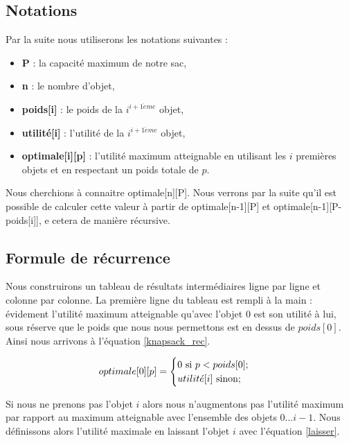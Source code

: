 \subsection{Notations}

Par la suite nous utiliserons les notations suivantes :

\begin{itemize}
\item \textbf{P} : la capacité maximum de notre sac,
\item \textbf{n} : le nombre d'objet,
\item \textbf{poids[i]} : le poids de la $i^{i+1\grave{e}me}$ objet,
\item \textbf{utilité[i]} : l'utilité de la $i^{i+1\grave{e}me}$ objet,
\item \textbf{optimale[i][p]} : l'utilité maximum atteignable en utilisant les $i$ premières objets et en respectant un poids totale de $p$.
\end{itemize} 

Nous cherchions à connaitre optimale[n][P]. Nous verrons par la suite qu'il est possible de calculer cette valeur à partir de optimale[n-1][P] et optimale[n-1][P-poids[i]], e cetera de manière récursive.

\subsection{Formule de récurrence}
Nous construirons un tableau de résultats intermédiaires ligne par ligne et colonne par colonne. La première ligne du tableau est rempli à la main : évidement l'utilité maximum atteignable qu'avec l'objet $0$ est son utilité à lui, sous réserve que le poids que nous nous permettons est en dessus de $poids[0]$. Ainsi nous arrivons à l'équation \ref{knapsack_rec}.

\begin{equation}
\label{knapsack_rec}
optimale[0][p] =
	\begin{cases}
		0 \text{ si } p < poids[0];	\\
		utilit\acute{e}[i] \text{ sinon};
	\end{cases} \\
\end{equation}

Si nous ne prenons pas l'objet $i$ alors nous n'augmentons pas l'utilité maximum par rapport au maximum atteignable avec l'ensemble des objets $0 \dots i-1$. Nous définissons alors l'utilité maximale en laissant l'objet $i$ avec l'équation \ref{laisser}.


